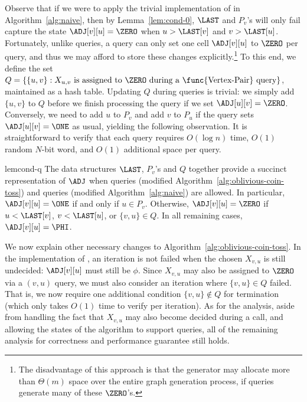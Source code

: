 Observe that if we were to apply the trivial implementation of  in Algorithm~\ref{alg:naive}, then by Lemma~\ref{lem:cond-0}, $\LAST$ and $P_v$'s will only fail capture the state $\ADJ[v][u] = \ZERO$ when $u > \LAST[v]$ and $v > \LAST[u]$. Fortunately, unlike  queries, a  query can only set one cell $\ADJ[v][u]$ to $\ZERO$ per query, and thus we may afford to store these changes explicitly.\footnote{The disadvantage of this approach is that the generator may allocate more than $\Theta(m)$ space over the entire graph generation process, if  queries generate many of these $\ZERO$'s.} To this end, we define the set $Q = \{\{u,v\}: X_{u,v}\textrm{ is assigned to }\ZERO \textrm{ during a \func{Vertex-Pair} query}\}$, maintained as a hash table. Updating $Q$ during  queries is trivial: we simply add $\{u,v\}$ to $Q$ before we finish processing the query if we set $\ADJ[u][v]=\ZERO$. Conversely, we need to add $u$ to $P_v$ and add $v$ to $P_u$ if the  query sets $\ADJ[u][v]=\ONE$ as usual, yielding the following observation. It is straightforward to verify that each  query requires $O(\log n)$ time, $O(1)$ random $N$-bit word, and $O(1)$ additional space per query.

\begin{restatable}{lem}{cond-q}\label{lem:cond-0-q}
The data structures $\LAST$, $P_v$'s and $Q$ together provide a succinct representation of $\ADJ$ when  queries (modified Algorithm~\ref{alg:oblivious-coin-toss}) and  queries (modified Algorithm~\ref{alg:naive}) are allowed. In particular, $\ADJ[v][u]=\ONE$ if and only if $u \in P_v$. Otherwise, $\ADJ[v][u]=\ZERO$ if $u <\LAST[v]$, $v < \LAST[u]$, or $\{v,u\} \in Q$. In all remaining cases, $\ADJ[v][u]=\PHI$.
\end{restatable}

We now explain other necessary changes to Algorithm~\ref{alg:oblivious-coin-toss}. In the implementation of , an iteration is not failed when the chosen $X_{v,u}$ is still undecided: $\ADJ[v][u]$ must still be $\phi$. Since $X_{v,u}$ may also be assigned to $\ZERO$ via a $(v,u)$ query, we must also consider an iteration where $\{v,u\} \in Q$ failed. That is, we now require one additional condition $\{v,u\} \notin Q$ for termination (which only takes $O(1)$ time to verify per iteration). As for the analysis, aside from handling the fact that $X_{v,u}$ may also become decided during a  call, and allowing the states of the algorithm to support  queries, all of the remaining analysis for correctness and performance guarantee still holds. 


